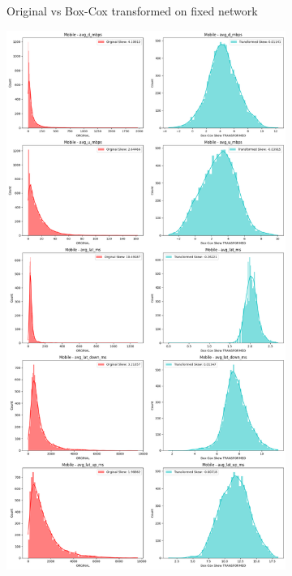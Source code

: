 \documentclass[
  letterpaper,
  DIV=11,
  numbers=noendperiod,
  oneside]{scrartcl}
\begin{document}
\begin{figure}
{\begin{figure}[H]
{}

\caption{Original vs Box-Cox transformed on fixed network}

\end{figure}

\begin{figure}[H]

{\centering \includegraphics{data-analytics_files/figure-latex/fig-transcomp-output-6.png}

}
\end{figure}}
\end{figure}
\end{document}
